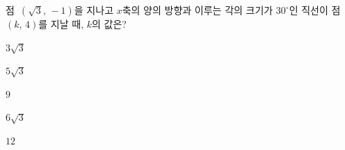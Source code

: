 점~$(\sqrt{3},\,-1)$을 지나고 $x$축의 양의 방향과 이루는 각의 크기가 $30^\circ$인 직선이 점~$(k,\,4)$를 지날 때, $k$의 값은?
\begin{choices32}{\rule[-3ex]{0pt}{8ex}$3\sqrt{3}$}{\rule[-3ex]{0pt}{8ex}$5\sqrt{3}$}{\rule[-3ex]{0pt}{8ex}$9$}{\rule[-3ex]{0pt}{8ex}$6\sqrt{3}$}{\rule[-3ex]{0pt}{8ex}$12$}\end{choices32}
